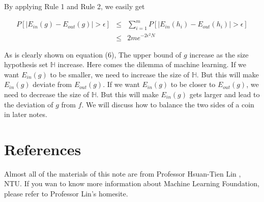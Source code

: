 \documentclass[11pt]{article}
\begin{document}
By applying Rule 1 and Rule 2, we easily get

\begin{eqnarray}
P[|E_{in}(g) - E_{out}(g)| > \epsilon] &\leq& \sum _{i=1}^{m}P[|E_{in}(h_i) - E_{out}(h_i)| > \epsilon]\\
&\leq& 2me^{-2\epsilon^2 N}
\end{eqnarray}

As is clearly shown on equation (6), The upper bound of $g$ increase as the size hypothesis set $\mathbb{H}$ increase. Here comes the dilemma of machine learning. If we want $E_{in}(g)$ to be smaller, we need to increase the size of $\mathbb{H}$. But this will make $E_{in}(g)$ deviate from $E_{out}(g)$. If we want $E_{in}(g)$ to be closer to $E_{out}(g)$, we need to decrease the size of $\mathbb{H}$. But this will make $E_{in}(g)$ gets larger and lead to the deviation of $g$ from $f$. We will discuss how to balance the two sides of a coin in later notes. 

\section{References}
Almost all of the materials of this note are from Professor Hsuan-Tien Lin , NTU. If you wan to know more information about Machine Learning Foundation, please refer to Professor Lin's homesite.
\end{document}

